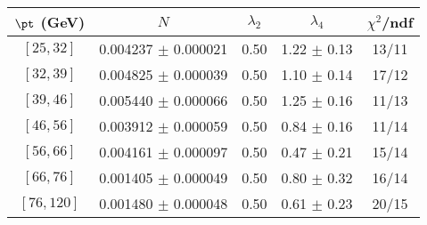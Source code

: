 \begin{tabular}{c||c|c|c|c}
$\pt$ (GeV) & $N$ & $\lambda_{2}$ & $\lambda_4$  & $\chi^2$/ndf  \\
\hline
$[25, 32]$ & 0.004237 $\pm$ 0.000021 & 0.50 & 1.22 $\pm$ 0.13 & 13/11\\
$[32, 39]$ & 0.004825 $\pm$ 0.000039 & 0.50 & 1.10 $\pm$ 0.14 & 17/12\\
$[39, 46]$ & 0.005440 $\pm$ 0.000066 & 0.50 & 1.25 $\pm$ 0.16 & 11/13\\
$[46, 56]$ & 0.003912 $\pm$ 0.000059 & 0.50 & 0.84 $\pm$ 0.16 & 11/14\\
$[56, 66]$ & 0.004161 $\pm$ 0.000097 & 0.50 & 0.47 $\pm$ 0.21 & 15/14\\
$[66, 76]$ & 0.001405 $\pm$ 0.000049 & 0.50 & 0.80 $\pm$ 0.32 & 16/14\\
$[76, 120]$ & 0.001480 $\pm$ 0.000048 & 0.50 & 0.61 $\pm$ 0.23 & 20/15\\
\end{tabular}
